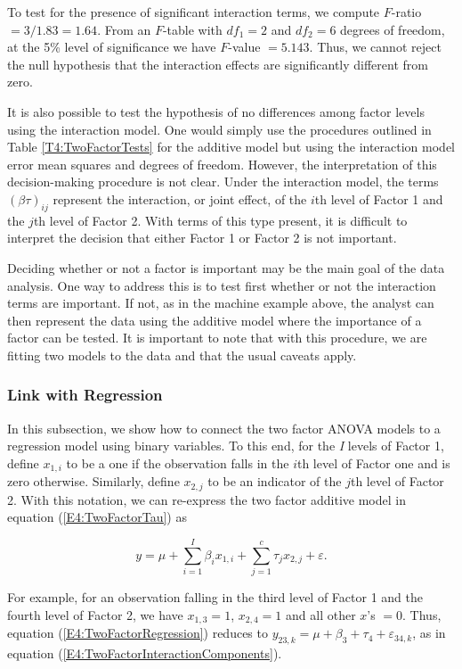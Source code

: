 To test for the presence of significant interaction terms, we
compute
$F$-ratio $=3/1.83=1.64$. From an $F$-table with $df_{1}=2$ and $%
df_{2}=6$ degrees of freedom, at the 5\% level of significance we
have $F$-value $=5.143$. Thus, we cannot reject the null hypothesis
that the interaction effects are significantly different from zero.

It is also possible to test the hypothesis of no differences among
factor levels using the interaction model. One would simply use the
procedures outlined in Table \ref{T4:TwoFactorTests} for the
additive model but using the interaction model error mean squares
and degrees of freedom. However, the interpretation of this
decision-making procedure is not clear. Under the interaction model,
the terms $(\beta \tau )_{ij}$ represent the interaction, or joint
effect, of the $i$th level of Factor 1 and the $j$th level of Factor
2. With terms of this type present, it is difficult to interpret the
decision that either Factor 1 or Factor 2 is not important.

Deciding whether or not a factor is important may be the main goal
of the data analysis. One way to address this is to test first
whether or not the interaction terms are important. If not, as in
the machine example above, the analyst can then represent the data
using the additive model where the importance of a factor can be
tested. It is important to note that with this procedure, we are
fitting two models to the data and that the usual caveats apply.

\subsubsection*{Link with Regression}

In this subsection, we show how to connect the two factor ANOVA
models to a regression model using binary variables. To this end,
for the \textit{I} levels of Factor 1, define $x_{1,i}$ to be a one
if the observation falls in the $i$th level of Factor one and is
zero otherwise. Similarly, define $x_{2,j}$ to be an indicator of
the $j$th level of Factor 2. With this notation, we can re-express
the two factor additive model in equation (\ref{E4:TwoFactorTau}) as

\begin{equation} \label{E4:TwoFactorRegression}
y=\mu +\sum_{i=1}^{I}\beta _{i}x_{1,i}+\sum_{j=1}^{c}\tau
_{j}x_{2,j} + \varepsilon.
\end{equation}

For example, for an observation falling in the third level of Factor
1 and the fourth level of Factor 2, we have $x_{1,3}=1$, $x_{2,4}=1$
and all other $x$'s $=0$. Thus, equation
(\ref{E4:TwoFactorRegression}) reduces to $y_{23,k}=\mu +\beta
_{3}+\tau _{4}+\varepsilon_{34,k}$, as in equation
(\ref{E4:TwoFactorInteractionComponents}).

